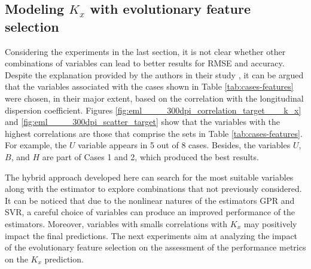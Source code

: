\documentclass[a4paper,12pt, english]{article}
\begin{document}



\subsection{\label{sec:ldc-efs} Modeling $K_x$ with evolutionary feature selection}


Considering the experiments in the last section, it is not clear whether other combinations of variables can lead to better results for RMSE and accuracy. Despite the explanation provided by the authors in their study \cite{tayfur2005predicting}, it can be argued that the variables associated with the cases shown in Table \ref{tab:cases-features} were chosen, in their major extent,  based on the correlation with the longitudinal dispersion coefficient. Figures \ref{fig:eml____300dpi_correlation_target___k_x} and \ref{fig:eml____300dpi_scatter_target} show that the variables with the highest correlations are those that comprise the sets in  Table \ref{tab:cases-features}.
For example, the $U$ variable appears in 5 out of 8 cases. Besides, the variables $U$, $B$, and $H$ are part of Cases 1 and 2, which produced the best results.

The hybrid approach developed here can search for the most suitable variables along with the estimator to explore combinations that not previously considered.  It can be noticed that due to the nonlinear natures of the estimators GPR and SVR,
a careful choice of variables can produce an improved performance of the estimators. Moreover, variables with smalls correlations with $K_x$ may positively impact the final predictions. The next experiments aim at analyzing the impact of the evolutionary feature selection on the assessment of the performance metrics on the $K_x$ prediction.
\end{document}
